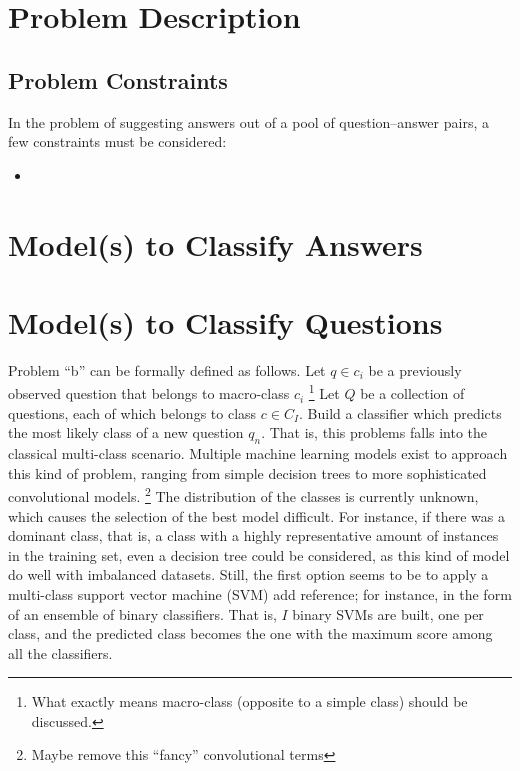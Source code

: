 \documentclass{sig-alternate-05-2015}
\newcommand{\abc}[1]{{\color{red} #1}}
\begin{document}
\section{Problem Description} 


\subsection{Problem Constraints}

In the problem of suggesting answers out of a pool of question--answer pairs, a 
few constraints must be considered:

\begin{itemize}
\item 
\end{itemize}





\section{Model(s) to Classify Answers}
\label{sec:l2r}


\section{Model(s) to Classify Questions}
Problem ``b'' can be formally defined as follows. Let $q\in c_i$ be a previously 
observed question that belongs to macro-class $c_i$%
\footnote{What exactly means macro-class (opposite to a simple class) should be 
discussed.}
Let $Q$ be a collection of questions, each of which belongs to class $c\in C_I$. 
Build a classifier which predicts the most likely class of a new question $q_n$. 
That is, this problems falls into the classical multi-class scenario. Multiple 
machine learning models exist to approach this kind of problem, ranging from 
simple decision trees to more sophisticated convolutional models.%
\footnote{Maybe remove this ``fancy'' convolutional terms}
The distribution of the classes is currently unknown, which causes the selection 
of the best model difficult. For instance, if there was a dominant class, that 
is, a class with a highly representative amount of instances in the training 
set, even a decision tree could be considered, as this kind of model do well 
with imbalanced datasets. Still, the first option seems to be to apply a 
multi-class support vector machine (SVM)\abc{add reference}; for instance, in 
the form of an ensemble of binary classifiers. That is, $I$ binary SVMs are 
built, one per class, and the predicted class becomes the one with the maximum 
score among all the classifiers. 
\end{document}
